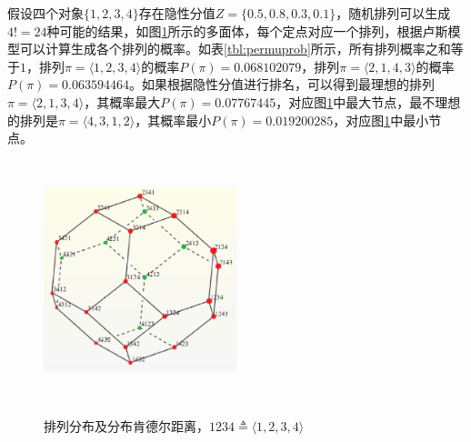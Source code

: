 \begin{example}
假设四个对象$\{1,2,3,4\}$存在隐性分值$Z=\{0.5, 0.8, 0.3, 0.1\}$，随机排列可以生成$4!=24$种可能的结果，如图\ref{fig:permprob-kendall}所示的多面体，每个定点对应一个排列，根据卢斯模型可以计算生成各个排列的概率。如表\ref{tbl:permuprob}所示，所有排列概率之和等于$1$，排列$\pi=\langle 1,2,3,4 \rangle$的概率$P(\pi)= 0.068102079$，排列$\pi=\langle 2,1,4,3 \rangle$的概率$P(\pi)=0.063594464$。如果根据隐性分值进行排名，可以得到最理想的排列$\pi=\langle 2,1,3,4 \rangle$，其概率最大$P(\pi)= 0.07767445$，对应图\ref{fig:permprob-kendall}中最大节点，最不理想的排列是$\pi=\langle 4,3,1,2\rangle$，其概率最小$P(\pi)=0.019200285$，对应图\ref{fig:permprob-kendall}中最小节点。

\begin{figure}[htbp]
  \centering
  \includegraphics[width=0.5\textwidth, height=7cm]{figures/permprob-kendall.eps}\\
  \caption{排列分布及分布肯德尔距离，$1234 \triangleq \langle 1,2,3,4 \rangle$}\label{fig:permprob-kendall}
\end{figure}


\end{example}

